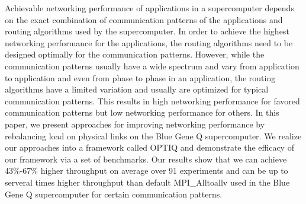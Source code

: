 Achievable networking performance of applications in a supercomputer depends on the exact combination of communication patterns of the applications and routing algorithms used by the supercomputer. In order to achieve the highest networking performance for the applications, the routing algorithms need to be designed optimally for the communication patterns. However, while the communication patterns usually have a wide spectrum and vary from application to application and even from phase to phase in an application, the routing algorithms have a limited variation and usually are optimized for typical communication patterns. This results in high networking performance for favored communication patterns but low networking performance for others. In this paper, we present approaches for improving networking performance by rebalancing load on physical links on the Blue Gene Q supercomputer. We realize our approaches into a framework called OPTIQ and demonstrate the efficacy of our framework via a set of benchmarks. Our results show that we can achieve 43\%-67\% higher throughput on average over 91 experiments and can be up to serveral times higher throughput than default MPI\_Alltoallv used in the Blue Gene Q supercomputer for certain communication patterns.

